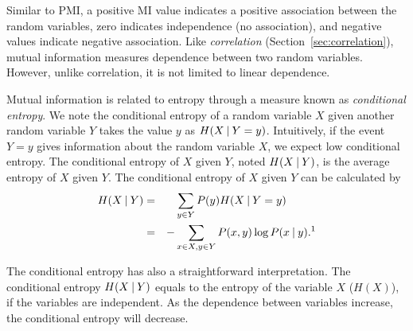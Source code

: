 Similar to PMI,
a positive MI value indicates a positive association between
the random variables,
zero indicates independence (no association),
and negative values indicate negative association.
Like \emph{correlation} (Section~\ref{sec:correlation}),
mutual information measures dependence between two random variables.
However, unlike correlation, it is not limited to linear dependence.

Mutual information is related to entropy
through a measure known as \emph{conditional entropy}.
We note the conditional entropy of a random variable $X$ given
another random variable $Y$ takes the value $y$ as $H(X\:\vert\:{}Y=y)$.
Intuitively,
if the event $Y=y$ gives information about the random variable $X$,
we expect low conditional entropy.
The conditional entropy of $X$ given $Y$,
noted $H(X\:\vert\:{}Y)$,
is the average entropy of $X$ given $Y$.
The conditional entropy of $X$ given $Y$ can be calculated by
\begin{equation}\label{eq:conditional-entropy}
  \begin{aligned}
    H(X\given{}Y) &= & &\sum_{y\in Y} P(y) H(X\given{}Y=y)\\
                  &= &- & \sum_{x\in X, y\in Y} P(x,y) \log P(x\given{}y)
  \text{.\footnotemark}\\
  \end{aligned}
\end{equation}%

The conditional entropy has also a straightforward interpretation.
The conditional entropy $H(X\:\vert\:{}Y)$ equals to
the entropy of the variable $X$ ($H(X)$),
if the variables are independent.
As the dependence between variables increase,
the conditional entropy will decrease.


\begin{marginfigure}
  \caption{\label{fig:entropy-mi}%
    Relation between conditional entropy entropy and mutual information.
    The total shaded area is the joint entropy of two variables $H(X,Y)$.
  }
\end{marginfigure}

